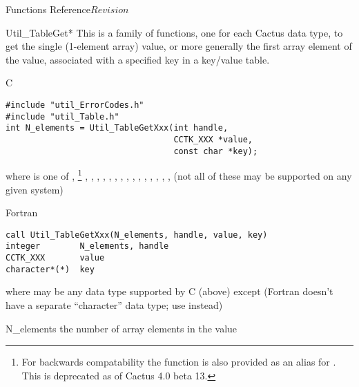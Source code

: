 \begin{cactuspart}{ Functions Reference}{}{$Revision$}

\begin{FunctionDescription}{Util\_TableGet*}
\label{Util-TableGet*}
This is a family of functions, one for each Cactus data type,
to get the single (1-element array) value, or more generally the
first array element of the value, associated with a specified key
in a key/value table.

\begin{SynopsisSection}
\begin{Synopsis}{C}
\begin{verbatim}
#include "util_ErrorCodes.h"
#include "util_Table.h"
int N_elements = Util_TableGetXxx(int handle,
                                  CCTK_XXX *value,
                                  const char *key);
\end{verbatim}
where  is one of
   , %
\footnote{%
	 For backwards compatability the function
	  is also provided
	 as an alias for .
	 This is deprecated as of Cactus 4.0 beta 13.
	 }%
,
   , ,
   , , , , ,
   , , , ,
   , , , 
(not all of these may be supported on any given system)
\end{Synopsis}
\begin{Synopsis}{Fortran}
\begin{verbatim}
call Util_TableGetXxx(N_elements, handle, value, key)
integer        N_elements, handle
CCTK_XXX       value
character*(*)  key
\end{verbatim}
where  may be any data type supported by C (above)
except  (Fortran doesn't have a separate ``character''
data type; use  instead)
\end{Synopsis}
\end{SynopsisSection}

\begin{ResultSection}
\begin{Result}{N\_elements}
the number of array elements in the value
\end{Result}
\end{ResultSection}


\end{FunctionDescription}
\end{cactuspart}
